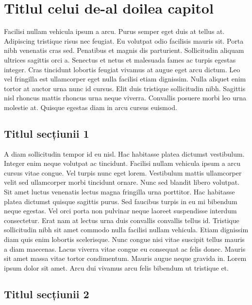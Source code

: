 \chapter{Titlul celui de-al doilea capitol}
Facilisi nullam vehicula ipsum a arcu. Purus semper eget duis at tellus at. Adipiscing tristique risus nec feugiat. Eu volutpat odio 
facilisis mauris sit. Porta nibh venenatis cras sed. Penatibus et magnis dis parturient. Sollicitudin aliquam ultrices sagittis orci a. 
Senectus et netus et malesuada fames ac turpis egestas integer. Cras tincidunt lobortis feugiat vivamus at augue eget arcu dictum. Leo 
vel fringilla est ullamcorper eget nulla facilisi etiam dignissim. Nulla aliquet enim tortor at auctor urna nunc id cursus. Elit duis 
tristique sollicitudin nibh. Sagittis nisl rhoncus mattis rhoncus urna neque viverra. Convallis posuere morbi leo urna molestie at. 
Quisque egestas diam in arcu cursus euismod.

\section{Titlul secțiunii 1}

A diam sollicitudin tempor id eu nisl. Hac habitasse platea dictumst vestibulum. Integer enim neque volutpat ac tincidunt. Facilisi 
nullam vehicula ipsum a arcu cursus vitae congue. Vel turpis nunc eget lorem. Vestibulum mattis ullamcorper velit sed ullamcorper morbi 
tincidunt ornare. Nunc sed blandit libero volutpat. Sit amet luctus venenatis lectus magna fringilla urna porttitor. Hac habitasse platea 
dictumst quisque sagittis purus. Sed faucibus turpis in eu mi bibendum neque egestas. Vel orci porta non pulvinar neque laoreet suspendisse 
interdum consectetur. Erat nam at lectus urna duis convallis convallis tellus id. Tristique sollicitudin nibh sit amet commodo nulla 
facilisi nullam vehicula. Etiam dignissim diam quis enim lobortis scelerisque. Nunc congue nisi vitae suscipit tellus mauris a diam 
maecenas. Lacus viverra vitae congue eu consequat ac felis donec. Mauris sit amet massa vitae tortor condimentum. Mauris augue neque 
gravida in. Lorem ipsum dolor sit amet. Arcu dui vivamus arcu felis bibendum ut tristique et.

\section{Titlul secțiunii 2}

